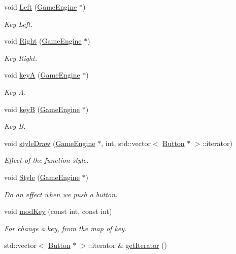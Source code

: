 \begin{DoxyCompactItemize}
void \hyperlink{class_intro_state_ae7aa16b3aeaf7a350778db783323151d}{Left} (\hyperlink{class_game_engine}{Game\+Engine} $\ast$)
\begin{DoxyCompactList}\small\item\em Key Left. \end{DoxyCompactList}\item 
void \hyperlink{class_intro_state_ac488a07c4b0553f3b350eea5cdc62a04}{Right} (\hyperlink{class_game_engine}{Game\+Engine} $\ast$)
\begin{DoxyCompactList}\small\item\em Key Right. \end{DoxyCompactList}\item 
void \hyperlink{class_intro_state_a35e3deb07bf99043dae0687b6080fc0e}{key\+A} (\hyperlink{class_game_engine}{Game\+Engine} $\ast$)
\begin{DoxyCompactList}\small\item\em Key A. \end{DoxyCompactList}\item 
void \hyperlink{class_intro_state_a870ebe1a0d0e9ecfaf721ec2508ece93}{key\+B} (\hyperlink{class_game_engine}{Game\+Engine} $\ast$)
\begin{DoxyCompactList}\small\item\em Key B. \end{DoxyCompactList}\item 
void \hyperlink{class_intro_state_a5e145ec83bb5e65def711e7c3c24ddda}{style\+Draw} (\hyperlink{class_game_engine}{Game\+Engine} $\ast$, int, std\+::vector$<$ \hyperlink{class_button}{Button} $\ast$ $>$\+::iterator)
\begin{DoxyCompactList}\small\item\em Effect of the function style. \end{DoxyCompactList}\item 
void \hyperlink{class_intro_state_a3904ef31d1fdc22eb85d6e5eb8903822}{Style} (\hyperlink{class_game_engine}{Game\+Engine} $\ast$)
\begin{DoxyCompactList}\small\item\em Do an effect when we push a button. \end{DoxyCompactList}\item 
void \hyperlink{class_intro_state_a1a0660cb7d07eea4c54c12d512ee1595}{mod\+Key} (const int, const int)
\begin{DoxyCompactList}\small\item\em For change a key, from the map of key. \end{DoxyCompactList}\item 
\hypertarget{class_intro_state_a9cfb285246e88c904d085cc4f94d1e96}{}std\+::vector$<$ \hyperlink{class_button}{Button} $\ast$ $>$\+::iterator \& \hyperlink{class_intro_state_a9cfb285246e88c904d085cc4f94d1e96}{get\+Iterator} ()\label{class_intro_state_a9cfb285246e88c904d085cc4f94d1e96}


\end{DoxyCompactItemize}
